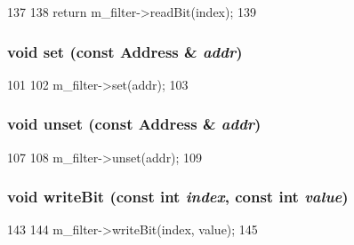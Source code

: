 \begin{DoxyCode}
137 {
138     return m_filter->readBit(index);
139 }
\end{DoxyCode}
\hypertarget{classGenericBloomFilter_a2b666fae2a5c2b98bc5cba8e1333bcc9}{
\subsubsection[{set}]{\setlength{\rightskip}{0pt plus 5cm}void set (const {\bf Address} \& {\em addr})}}
\label{classGenericBloomFilter_a2b666fae2a5c2b98bc5cba8e1333bcc9}



\begin{DoxyCode}
101 {
102     m_filter->set(addr);
103 }
\end{DoxyCode}
\hypertarget{classGenericBloomFilter_a69b772787ea61467af679e3aa5406b41}{
\subsubsection[{unset}]{\setlength{\rightskip}{0pt plus 5cm}void unset (const {\bf Address} \& {\em addr})}}
\label{classGenericBloomFilter_a69b772787ea61467af679e3aa5406b41}



\begin{DoxyCode}
107 {
108     m_filter->unset(addr);
109 }
\end{DoxyCode}
\hypertarget{classGenericBloomFilter_ac188318778d26b44f567c5b530598c16}{
\subsubsection[{writeBit}]{\setlength{\rightskip}{0pt plus 5cm}void writeBit (const int {\em index}, \/  const int {\em value})}}
\label{classGenericBloomFilter_ac188318778d26b44f567c5b530598c16}



\begin{DoxyCode}
143 {
144     m_filter->writeBit(index, value);
145 }
\end{DoxyCode}


